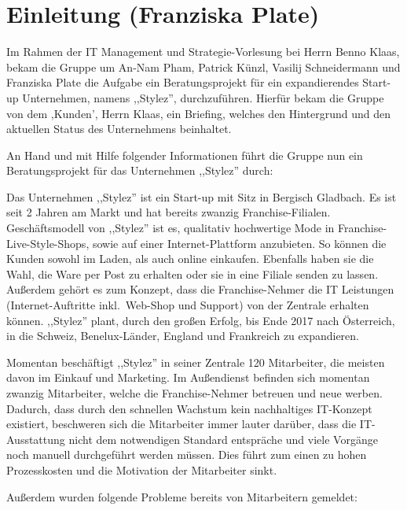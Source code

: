 \section{Einleitung (Franziska Plate)}

Im Rahmen der IT Management und Strategie-Vorlesung bei Herrn Benno
Klaas, bekam die Gruppe um An-Nam Pham, Patrick Künzl, Vasilij
Schneidermann und Franziska Plate die Aufgabe ein Beratungsprojekt für
ein expandierendes Start-up Unternehmen, namens ,,Stylez'',
durchzuführen. Hierfür bekam die Gruppe von dem ,Kunden', Herrn Klaas,
ein Briefing, welches den Hintergrund und den aktuellen Status des
Unternehmens beinhaltet.

An Hand und mit Hilfe folgender Informationen führt die Gruppe nun ein
Beratungsprojekt für das Unternehmen ,,Stylez'' durch:

Das Unternehmen ,,Stylez'' ist ein Start-up mit Sitz in Bergisch
Gladbach. Es ist seit 2 Jahren am Markt und hat bereits zwanzig
Franchise-Filialen. Geschäftsmodell von ,,Stylez'' ist es, qualitativ
hochwertige Mode in Franchise-Live-Style-Shops, sowie auf einer
Internet-Plattform anzubieten. So können die Kunden sowohl im Laden,
als auch online einkaufen. Ebenfalls haben sie die Wahl, die Ware per
Post zu erhalten oder sie in eine Filiale senden zu lassen. Außerdem
gehört es zum Konzept, dass die Franchise-Nehmer die IT Leistungen
(Internet-Auftritte inkl.~Web-Shop und Support) von der Zentrale
erhalten können. ,,Stylez'' plant, durch den großen Erfolg, bis Ende
2017 nach Österreich, in die Schweiz, Benelux-Länder, England und
Frankreich zu expandieren.

Momentan beschäftigt ,,Stylez'' in seiner Zentrale 120 Mitarbeiter,
die meisten davon im Einkauf und Marketing. Im Außendienst befinden
sich momentan zwanzig Mitarbeiter, welche die Franchise-Nehmer
betreuen und neue werben. Dadurch, dass durch den schnellen Wachstum
kein nachhaltiges IT-Konzept existiert, beschweren sich die
Mitarbeiter immer lauter darüber, dass die IT-Ausstattung nicht dem
notwendigen Standard entspräche und viele Vorgänge noch manuell
durchgeführt werden müssen. Dies führt zum einen zu hohen
Prozesskosten und die Motivation der Mitarbeiter sinkt.

Außerdem wurden folgende Probleme bereits von Mitarbeitern gemeldet:

